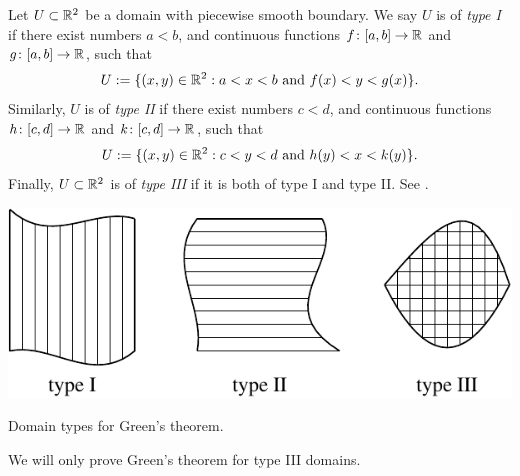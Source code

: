 Let $U \subset {\mathbb{R}}^2$ be a domain with piecewise smooth boundary.
We say $U$ is of \emph{type I}
if there exist numbers
$a < b$, and continuous
functions $f \colon [a,b] \to {\mathbb{R}}$ and
$g \colon [a,b] \to {\mathbb{R}}$, such that
\begin{equation*}
U := \{ (x,y) \in {\mathbb{R}}^2 : a < x < b \text{ and } f(x) < y < g(x) \} .
\end{equation*}
Similarly, $U$ is of \emph{type II}
if there exist numbers
$c < d$, and continuous
functions $h \colon [c,d] \to {\mathbb{R}}$ and
$k \colon [c,d] \to {\mathbb{R}}$, such that
\begin{equation*}
U := \{ (x,y) \in {\mathbb{R}}^2 : c < y < d \text{ and } h(y) < x < k(y) \} .
\end{equation*}
Finally, $U \subset {\mathbb{R}}^2$ is of \emph{type III}
if it is both of type I and type II.  See .

\begin{myfigureht}
\includegraphics{figures/greenstypes}
\caption{Domain types for Green's theorem.\label{fig:greenstypes}}
\end{myfigureht}


We will only prove Green's theorem for type III domains.


